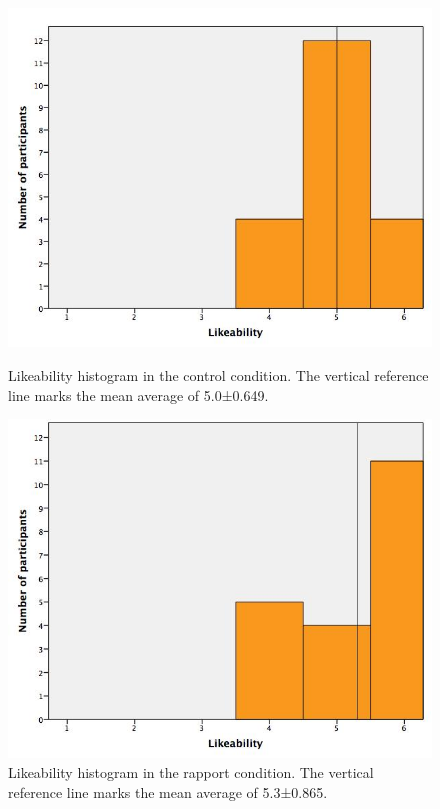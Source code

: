 \begin{figure}[H]
	\centering
	\begin{minipage}[b]{.45\textwidth}
		\centering
		\includegraphics[width=\textwidth]{images/LikabilityBaseline.jpeg}
		\caption{Likeability histogram in the control condition. The vertical reference line marks the mean average of 5.0±0.649.}
		\label{fig:likeability_baseline}
	\end{minipage}
	\hfill
	\begin{minipage}[b]{.45\textwidth}
		\centering
		\includegraphics[width=\textwidth]{images/LikabilityRapport.jpeg}
		\caption{Likeability histogram in the rapport condition. The vertical reference line marks the mean average of 5.3±0.865.}
		\label{fig:likeability_rapport}
	\end{minipage}
\end{figure}

